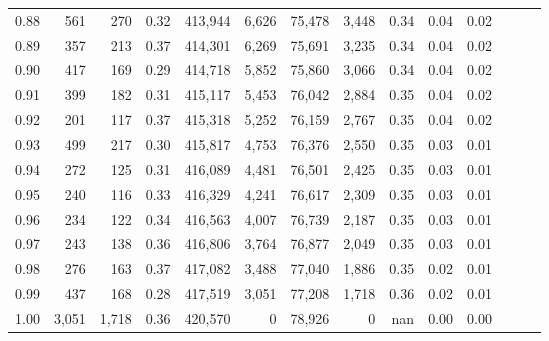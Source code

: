 \begin{tabular}{rrrrrrrrrrrrrr}
0.88 &     561 &    270 &  0.32 &  413,944 &    6,626 &  75,478 &   3,448 &  0.34 &  0.04 &      0.02 \\
0.89 &     357 &    213 &  0.37 &  414,301 &    6,269 &  75,691 &   3,235 &  0.34 &  0.04 &      0.02 \\
0.90 &     417 &    169 &  0.29 &  414,718 &    5,852 &  75,860 &   3,066 &  0.34 &  0.04 &      0.02 \\
0.91 &     399 &    182 &  0.31 &  415,117 &    5,453 &  76,042 &   2,884 &  0.35 &  0.04 &      0.02 \\
0.92 &     201 &    117 &  0.37 &  415,318 &    5,252 &  76,159 &   2,767 &  0.35 &  0.04 &      0.02 \\
0.93 &     499 &    217 &  0.30 &  415,817 &    4,753 &  76,376 &   2,550 &  0.35 &  0.03 &      0.01 \\
0.94 &     272 &    125 &  0.31 &  416,089 &    4,481 &  76,501 &   2,425 &  0.35 &  0.03 &      0.01 \\
0.95 &     240 &    116 &  0.33 &  416,329 &    4,241 &  76,617 &   2,309 &  0.35 &  0.03 &      0.01 \\
0.96 &     234 &    122 &  0.34 &  416,563 &    4,007 &  76,739 &   2,187 &  0.35 &  0.03 &      0.01 \\
0.97 &     243 &    138 &  0.36 &  416,806 &    3,764 &  76,877 &   2,049 &  0.35 &  0.03 &      0.01 \\
0.98 &     276 &    163 &  0.37 &  417,082 &    3,488 &  77,040 &   1,886 &  0.35 &  0.02 &      0.01 \\
0.99 &     437 &    168 &  0.28 &  417,519 &    3,051 &  77,208 &   1,718 &  0.36 &  0.02 &      0.01 \\
1.00 &   3,051 &  1,718 &  0.36 &  420,570 &        0 &  78,926 &       0 &   nan &  0.00 &      0.00 \\
\bottomrule
\end{tabular}
